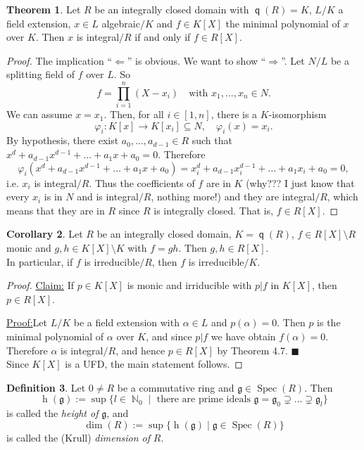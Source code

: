 \documentclass[12pt,a4paper]{report}
\theoremstyle{definition}
\newtheorem{theorem}{Theorem}[chapter] %
\newtheorem{corollary}[theorem]{Corollary} %
\newtheorem{defn}[theorem]{Definition}
\theoremstyle{num.custom-title}
\newenvironment{claim}[1]{\par\noindent\underline{Claim#1:}\space}{} %
\newenvironment{claimproof}[1]{\par\noindent\underline{Proof:}\space#1}{\leavevmode\unskip\penalty9999 \hbox{}\nobreak\hfill\quad\hbox{$\blacksquare$}} %
\DeclareMathOperator{\N}{\mathbb{N}}
\DeclareMathOperator{\imp}{\Rightarrow}
\DeclareMathOperator{\pmi}{\Leftarrow}
\DeclareMathOperator{\sm}{\setminus}
\DeclareMathOperator{\sse}{\subseteq}
\DeclareMathOperator{\Spec}{Spec}
\DeclareMathOperator{\q}{\mathsf{q}}
\DeclareMathOperator{\h}{h}
\newcommand{\g}{\mathfrak{g}}
\renewcommand{\phi}{\varphi}
\begin{document}
\begin{theorem}\label{thm-min_poly_int_el}
Let $R$ be an integrally closed domain with $\q(R)=K$, $L/K$ a field extension, $x \in L$ algebraic$/K$ and $f \in K[X]$ the minimal polynomial of $x$ over $K$. Then $x$ is integral$/R$ if and only if $f \in R[X]$.
\begin{proof}
The implication ``$\pmi$'' is obvious. We want to show ``$\imp$''. Let $N/L$ be a splitting field of $f$ over $L$. So
\[
f = \prod_{i=1}^n (X-x_i) \quad \text{with } x_1,...,x_n \in N.
\]
We can assume $x=x_1$. Then, for all $i \in [1,n]$, there is a $K$-isomorphism
\[
\phi_i : K[x] \to K[x_i] \sse N, \quad \phi_i(x) = x_i.
\]
By hypothesis, there exist $a_0,...,a_{d-1} \in R$ such that $x^d+a_{d-1}x^{d-1} + \ldots + a_1 x + a_0 = 0$. Therefore
\[
\phi_i(x^d+a_{d-1}x^{d-1} + \ldots + a_1 x + a_0) = x_i^d+a_{d-1}x_i^{d-1} + \ldots + a_1 x_i + a_0 = 0,
\]
i.e. $x_i$ is integral$/R$. Thus the coefficients of $f$ are in $K$ (why??? I just know that every $x_i$ is in $N$ and is integral$/R$, nothing more!) and they are integral$/R$, which means that they are in $R$ since $R$ is integrally closed. That is, $f \in R[X]$.
\end{proof}
\end{theorem}

\begin{corollary}
Let $R$ be an integrally closed domain, $K = \q(R)$, $f \in R[X] \sm R$ monic and $g,h \in K[X] \sm K$ with $f=gh$. Then $g,h \in R[X]$.\\
In particular, if $f$ is irreducible$/R$, then $f$ is irreducible$/K$.
\begin{proof}
\begin{claim}{}
If $p \in K[X]$ is monic and irriducible with $p|f$ in $K[X]$, then $p \in R[X]$.
\begin{claimproof}
Let $L/K$ be a field extension with $\alpha \in L$ and $p(\alpha)=0$. Then $p$ is the minimal polynomial of $\alpha$ over $K$, and since $p|f$ we have obtain $f(\alpha)=0$. Therefore $\alpha$ is integral$/R$, and hence $p \in R[X]$ by Theorem 4.7.
\end{claimproof}\\
Since $K[X]$ is a UFD, the main statement follows.
\end{claim}
\end{proof}
\end{corollary}

\begin{defn}
Let $0 \neq R$ be a commutative ring and $\g \in \Spec(R)$. Then
\[
\h(\g) := \sup\{l \in \N_0 \mid \text{ there are prime ideals } \g = \g_0 \supsetneq \ldots \supsetneq \g_l \}
\]
is called the \emph{height of} $\g$, and
\[
\dim(R) := \sup\{ \h(\g) \mid \g \in \Spec(R)\}
\]
is called the (Krull) \emph{dimension of} $R$.
\end{defn}
\end{document}
